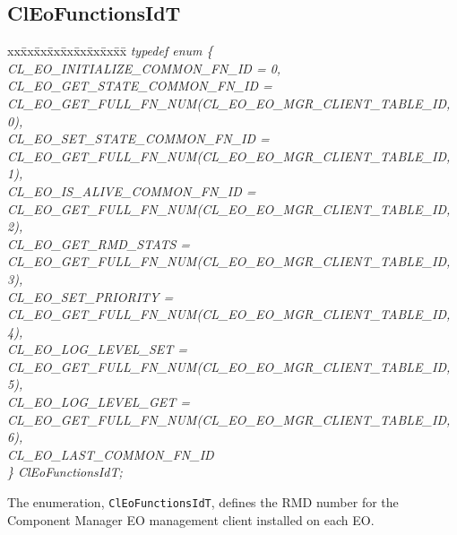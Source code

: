 {\subsection{ClEoFunctionsIdT}
\begin{tabbing}
xx\=xx\=xx\=xx\=xx\=xx\=xx\=xx\=xx\=\kill
\textit{typedef enum \{}\\
\>\>\>\>\textit{CL\_EO\_INITIALIZE\_COMMON\_FN\_ID = 0,}\\
\>\>\>\>\textit{CL\_EO\_GET\_STATE\_COMMON\_FN\_ID =}\\
\>\>\>\>\>\>\textit{CL\_EO\_GET\_FULL\_FN\_NUM(CL\_EO\_EO\_MGR\_CLIENT\_TABLE\_ID, 0),}\\
\>\>\>\>\textit{CL\_EO\_SET\_STATE\_COMMON\_FN\_ID =}\\
\>\>\>\>\>\>\textit{CL\_EO\_GET\_FULL\_FN\_NUM(CL\_EO\_EO\_MGR\_CLIENT\_TABLE\_ID, 1),}\\
\>\>\>\>\textit{CL\_EO\_IS\_ALIVE\_COMMON\_FN\_ID =}\\
\>\>\>\>\>\>\textit{CL\_EO\_GET\_FULL\_FN\_NUM(CL\_EO\_EO\_MGR\_CLIENT\_TABLE\_ID, 2),}\\
\>\>\>\>\textit{CL\_EO\_GET\_RMD\_STATS =}\\
\>\>\>\>\>\>\textit{CL\_EO\_GET\_FULL\_FN\_NUM(CL\_EO\_EO\_MGR\_CLIENT\_TABLE\_ID, 3),}\\
\>\>\>\>\textit{CL\_EO\_SET\_PRIORITY =}\\
\>\>\>\>\>\>\textit{CL\_EO\_GET\_FULL\_FN\_NUM(CL\_EO\_EO\_MGR\_CLIENT\_TABLE\_ID, 4),}\\
\>\>\>\>\textit{CL\_EO\_LOG\_LEVEL\_SET =}\\
\>\>\>\>\>\>\textit{CL\_EO\_GET\_FULL\_FN\_NUM(CL\_EO\_EO\_MGR\_CLIENT\_TABLE\_ID, 5),}\\
\>\>\>\>\textit{CL\_EO\_LOG\_LEVEL\_GET =}\\
\>\>\>\>\>\>\textit{CL\_EO\_GET\_FULL\_FN\_NUM(CL\_EO\_EO\_MGR\_CLIENT\_TABLE\_ID, 6),}\\
\>\>\>\>\textit{CL\_EO\_LAST\_COMMON\_FN\_ID}\\
\textit{\} ClEoFunctionsIdT;}\\
\end{tabbing}

The enumeration, {\tt{ClEoFunctionsIdT}}, defines the RMD number for the Component Manager EO management client installed on each EO. 

}
